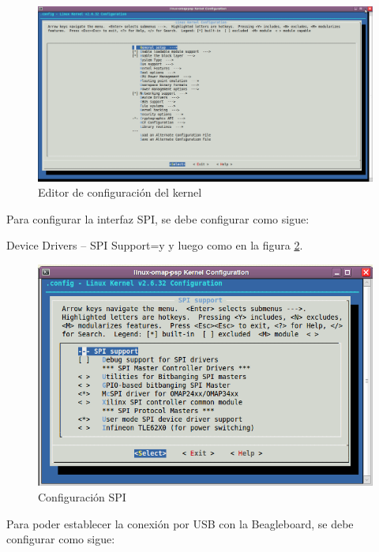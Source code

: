 \begin{figure}[H]
\centering
  \begin{center}
  \includegraphics[scale=.3]{Imagenes/kernel.png} 
  \end{center}
  \caption{Editor de configuración del kernel}\label{Fig:kernel} 
\end{figure}

Para configurar la interfaz SPI, se debe configurar como sigue:

Device Drivers – SPI Support=y y luego como en la figura \ref{Fig:spi}.

\begin{figure}[H]
\centering
  \begin{center}
  \includegraphics[scale=.4]{Imagenes/spi_chica.png} 
  \end{center}
  \caption{Configuración SPI}\label{Fig:spi} 
\end{figure}


Para poder establecer la conexión por USB con la Beagleboard, se debe configurar como sigue: 

